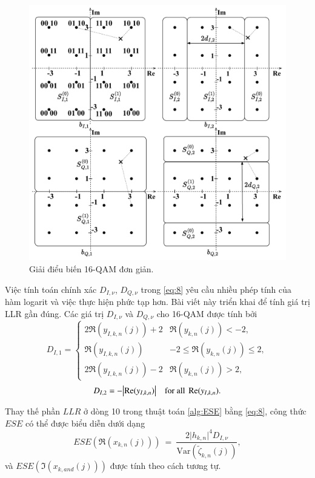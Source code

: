 \begin{figure}
	\centering
	\includegraphics[width=0.75\linewidth]{figure/Chap2/16-QAM.pdf}
	\caption{Giải điểu biến 16-QAM đơn giản.}
	\label{fig:16-QAM}
	\vspace{-1em}
\end{figure}

Việc tính toán chính xác $D_{I,\nu}$, $D_{Q,\nu}$ trong \eqref{eq:8} yêu cầu nhiều phép tính của hàm logarit và việc thực hiện phức tạp hơn. Bài viết này triển khai \cite{SimpleDemap} để tính giá trị LLR gần đúng. Các giá trị $D_{I,\nu}$ và $D_{Q,\nu}$ cho 16-QAM được tính bởi
\begin{equation}
	D_{I,1}=\left\{
	\begin{matrix}
		2\Re(y_{I,k,n}(j))+2 & \Re(y_{k,n}(j)) < -2,          \\
		\Re(y_{I,k,n}(j))    & -2\leq \Re(y_{k,n}(j)) \leq 2, \\
		2\Re(y_{I,k,n}(j))-2 & \Re(y_{k,n}(j)) > 2,
	\end{matrix}
	\right. \label{eq:9}
\end{equation}
\begin{equation}
	\begin{matrix}
		D_{I,2}=-\absolutevalue{\Re(y_{I,k,n})} & \text{for all } \Re(y_{I,k,n}).
	\end{matrix}
	\label{eq:10}
\end{equation}

Thay thế phần $LLR$ ở dòng 10 trong thuật toán \ref{alg:ESE} bằng \eqref{eq:8}, công thức $ESE$ có thể được biểu diễn dưới dạng
\begin{equation}
	ESE(\Re(x_{k,n}(j)))~=~\dfrac{2\lvert h_{k,n}\rvert^4D_{I,\nu}}
	{\text{Var}(\tilde{\zeta}_{k,n}(j))},
\end{equation}
và $ESE(\Im(x_{k,and}(j)))$ được tính theo cách tương tự.


